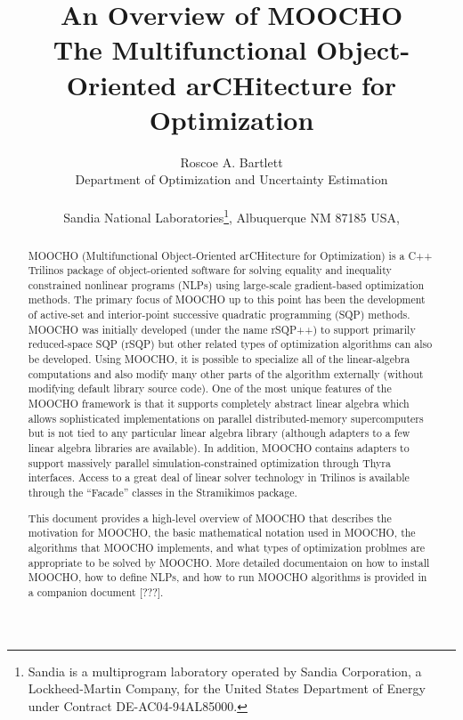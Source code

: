 \documentclass[pdf,ps2pdf,11pt]{SANDreport}
\title{
\center
An Overview of MOOCHO \\[2ex]
The Multifunctional Object-Oriented arCHitecture for Optimization
}
\author{
Roscoe A. Bartlett \\ Department of Optimization and Uncertainty Estimation \\ \\ Sandia National
Laboratories\footnote{ Sandia is a multiprogram laboratory operated by Sandia
Corporation, a Lockheed-Martin Company, for the United States Department of
Energy under Contract DE-AC04-94AL85000.}, Albuquerque NM 87185 USA, \\ }
\date{}
\begin{document}
\maketitle

%

%
\begin{abstract}
%

MOOCHO (Multifunctional Object-Oriented arCHitecture for Optimization) is a
C++ Trilinos package of object-oriented software for solving equality and
inequality constrained nonlinear programs (NLPs) using large-scale
gradient-based optimization methods.  The primary focus of MOOCHO up to this
point has been the development of active-set and interior-point successive
quadratic programming (SQP) methods.  MOOCHO was initially developed (under
the name rSQP++) to support primarily reduced-space SQP (rSQP) but other
related types of optimization algorithms can also be developed.  Using MOOCHO,
it is possible to specialize all of the linear-algebra computations and also
modify many other parts of the algorithm externally (without modifying default
library source code).  One of the most unique features of the MOOCHO framework
is that it supports completely abstract linear algebra which allows
sophisticated implementations on parallel distributed-memory supercomputers
but is not tied to any particular linear algebra library (although adapters to
a few linear algebra libraries are available).  In addition, MOOCHO contains
adapters to support massively parallel simulation-constrained optimization
through Thyra interfaces.  Access to a great deal of linear solver technology
in Trilinos is available through the ``Facade'' classes in the Stramikimos
package.

This document provides a high-level overview of MOOCHO that describes the
motivation for MOOCHO, the basic mathematical notation used in MOOCHO, the
algorithms that MOOCHO implements, and what types of optimization problmes are
appropriate to be solved by MOOCHO.  More detailed documentaion on how to
install MOOCHO, how to define NLPs, and how to run MOOCHO algorithms is
provided in a companion document [???].

%
\end{abstract}
%

%
\clearpage
\end{document}
